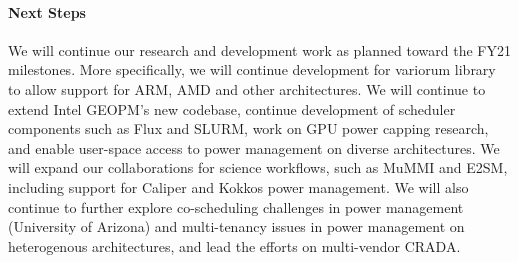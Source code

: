 \paragraph{Next Steps}
We will continue our research and development work as planned toward the FY21 milestones. More specifically, we will continue development for variorum library to allow support for ARM, AMD and other architectures. We will continue to extend Intel GEOPM's new codebase, continue development of scheduler components such as Flux and SLURM, work on GPU power capping research, and enable user-space access to power management on diverse architectures. We will expand our collaborations for science workflows, such as MuMMI and E2SM, including support for Caliper and Kokkos power management. We will also continue to further explore co-scheduling challenges in power management (University of Arizona) and multi-tenancy issues in power management on heterogenous architectures, and lead the efforts on multi-vendor CRADA. 
